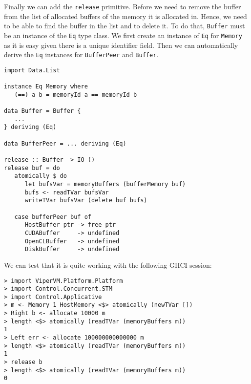 Finally we can add the \texttt{release} primitive. Before we need to remove the
buffer from the list of allocated buffers of the memory it is allocated in.
Hence, we need to be able to find the buffer in the list and to delete it. To do
that, \texttt{Buffer} must be an instance of the \texttt{Eq} type class. We
first create an instance of \texttt{Eq} for \texttt{Memory} as it is easy given
there is a unique identifier field. Then we can automatically derive the
\texttt{Eq} instances for \texttt{BufferPeer} and \texttt{Buffer}.

\begin{lstlisting}
import Data.List

instance Eq Memory where
   (==) a b = memoryId a == memoryId b

data Buffer = Buffer {
   ...
} deriving (Eq)

data BufferPeer = ... deriving (Eq)

release :: Buffer -> IO ()
release buf = do
   atomically $ do
      let bufsVar = memoryBuffers (bufferMemory buf)
      bufs <- readTVar bufsVar
      writeTVar bufsVar (delete buf bufs)

   case bufferPeer buf of
      HostBuffer ptr -> free ptr
      CUDABuffer     -> undefined
      OpenCLBuffer   -> undefined
      DiskBuffer     -> undefined
\end{lstlisting}

We can test that it is quite working with the following GHCI session:
\begin{lstlisting}
> import ViperVM.Platform.Platform
> import Control.Concurrent.STM
> import Control.Applicative
> m <- Memory 1 HostMemory <$> atomically (newTVar [])
> Right b <- allocate 10000 m
> length <$> atomically (readTVar (memoryBuffers m))
1
> Left err <- allocate 100000000000000 m
> length <$> atomically (readTVar (memoryBuffers m))
1
> release b
> length <$> atomically (readTVar (memoryBuffers m))
0
\end{lstlisting}

